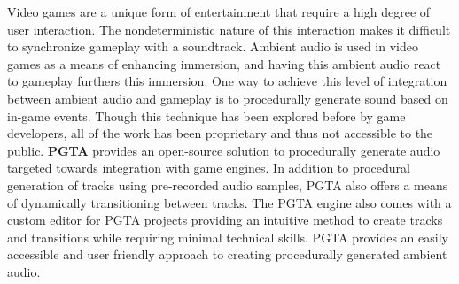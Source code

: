 Video games are a unique form of entertainment that require a high degree of user interaction. The nondeterministic 
nature of this interaction makes it difficult to synchronize gameplay with a soundtrack. Ambient audio is used in
video games as a means of enhancing immersion, and having this ambient audio react to gameplay furthers this
immersion. One way to achieve this level of integration between ambient audio and gameplay is to procedurally generate
sound based on in-game events. Though this technique has been explored before by game developers, all of the work has
been proprietary and thus not accessible to the public. \textbf{PGTA} provides an open-source solution to procedurally
generate audio targeted towards integration with game engines. In addition to procedural generation of tracks using
pre-recorded audio samples, PGTA also offers a means of dynamically transitioning between tracks. The PGTA engine also
comes with a custom editor for PGTA projects providing an intuitive method to create tracks and transitions while
requiring minimal technical skills. PGTA provides an easily accessible and user friendly approach to creating
procedurally generated ambient audio.
